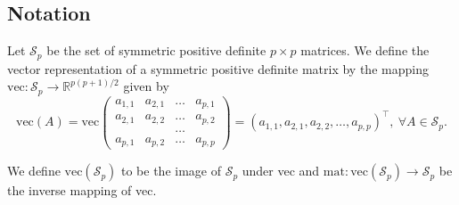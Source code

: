 

\subsection{Notation}
Let $\mathcal{S}_p$ be the set of symmetric positive definite $p \times p$ matrices. We define the vector representation of a symmetric positive definite matrix by the mapping $\text{vec} : \mathcal{S}_p \rightarrow \mathbb{R}^{p(p+1)/2}$ given by
\begin{equation*}
    \text{vec}(A) = \text{vec}\left(\begin{matrix}
        a_{1,1} & a_{2, 1} & \ldots & a_{p, 1} \\
        a_{2,1} & a_{2, 2} & \ldots & a_{p, 2} \\
                &          & \ldots & \\
        a_{p,1} & a_{p, 2} & \ldots & a_{p, p}
    \end{matrix}\right) = \left( a_{1,1}, a_{2,1}, a_{2,2}, \ldots, a_{p, p} \right)^\top, \ \forall A \in \mathcal{S}_p.
\end{equation*}

We define $\text{vec}(\mathcal{S}_p)$ to be the image of $\mathcal{S}_p$ under vec and $\text{mat} : \text{vec}(\mathcal{S}_p) \rightarrow \mathcal{S}_p$ be the inverse mapping of vec.


